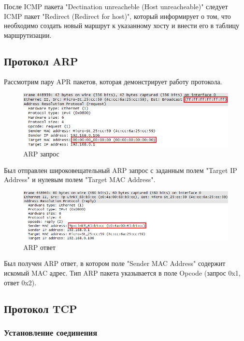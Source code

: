 \documentclass[14pt,a4paper,report]{report}
\begin{document}
После ICMP пакета "Dectination unreacheble (Host unreacheable)" следует ICMP пакет "Redirect (Redirect for host)", который информирует о том, что необходимо создать новый маршрут к указанному хосту и внести его в таблицу маршрутизации.

\clearpage

\subsection{Протокол ARP}

Рассмотрим пару APR пакетов, которая демонстрирует работу протокола.

\begin{figure}[h!]
	\centering
	\includegraphics[scale =  0.85]{images/arp1.png}
	
	\caption{ARP запрос}
	\label{image:13}
\end{figure}

Был отправлен широковещательный ARP запрос с заданным полем "Target IP Address" и нулевым полем "Target MAC Address". 

\begin{figure}[h!]
	\centering
	\includegraphics[scale = 0.80]{images/arp2.png}
	
	\caption{ARP ответ}
	\label{image:14}
\end{figure}

Был получен ARP ответ, в котором поле "Sender MAC Address" содержит искомый MAC адрес. Тип ARP пакета указывается в поле Opcode (запрос 0x1, ответ 0x2).

\subsection{Протокол TCP}

\subsubsection{Установление соединения}
\end{document}
